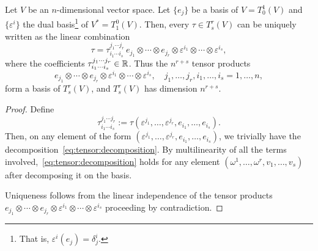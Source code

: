 \begin{proposition}\label{prop:tensorbasis}
	Let $V$ be an $n$-dimensional vector space.
	Let $\{e_j\}$ be a basis of $V=T_0^1(V)$ and $\{\varepsilon^i\}$ the dual basis\footnote{That is, $\varepsilon^i(e_j) = \delta^i_j$.} of $V^*=T_1^0(V)$.
	Then, every $\tau\in T_s^r(V)$ can be uniquely written as the linear combination%
	\begin{equation}\label{eq:tensor:decomposition}
		\tau = \tau^{j_1\cdots j_r}_{i_1\cdots i_s} \, e_{j_1}\otimes\cdots\otimes e_{j_r}\otimes \varepsilon^{i_1}\otimes \cdots\otimes \varepsilon^{i_s},
	\end{equation}
	where the coefficients $\tau^{j_1\cdots j_r}_{i_1\cdots i_s}\in\mathbb{R}$.
	Thus the $n^{r+s}$ tensor products
	\begin{equation}\label{eq:tensor:decompo}
		e_{j_1}\otimes\cdots\otimes e_{j_r}\otimes \varepsilon^{i_1}\otimes \cdots\otimes \varepsilon^{i_s}, \quad j_1,\ldots,j_r, i_1,\ldots,i_s = 1,\ldots,n,
	\end{equation}
	form a basis of $T_s^r(V)$, and $T_s^r(V)$ has dimension $n^{r+s}$.
\end{proposition}

\begin{proof}
	Define
	\begin{equation}
		\tau^{j_1\cdots j_r}_{i_1\cdots i_s} := \tau(\varepsilon^{j_1}, \ldots, \varepsilon^{j_r}, e_{i_1}, \ldots, e_{i_s}).
	\end{equation}
	Then, on any element of the form $(\varepsilon^{j_1}, \ldots, \varepsilon^{j_r}, e_{i_1}, \ldots, e_{i_s})$, we trivially have the decomposition~\eqref{eq:tensor:decomposition}.
	By multilinearity of all the terms involved,~\eqref{eq:tensor:decomposition} holds for any element $(\omega^1, \ldots, \omega^r, v_1, \ldots, v_s)$ after decomposing it on the basis.

	Uniqueness follows from the linear independence of the tensor products $e_{j_1}\otimes\cdots\otimes e_{j_r}\otimes \varepsilon^{i_1}\otimes \cdots\otimes \varepsilon^{i_s}$ proceeding by contradiction.
\end{proof}

